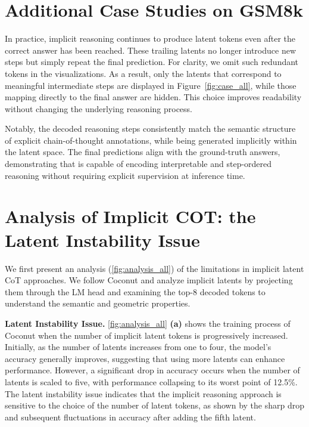 \section{Additional Case Studies on GSM8k}
In practice, implicit reasoning continues to produce latent tokens even after the correct answer has been reached. These trailing latents no longer introduce new steps but simply repeat the final prediction. For clarity, we omit such redundant tokens in the visualizations. As a result, only the latents that correspond to meaningful intermediate steps are displayed in Figure~\ref{fig:case_all}, while those mapping directly to the final answer are hidden. This choice improves readability without changing the underlying reasoning process.

Notably, the decoded reasoning steps consistently match the semantic structure of explicit chain-of-thought annotations, while being generated implicitly within the latent space. The final predictions align with the ground-truth answers, demonstrating that \methodname is capable of encoding interpretable and step-ordered reasoning without requiring explicit supervision at inference time.  




\section{Analysis of Implicit COT: the Latent Instability Issue}
We first present an analysis (\cref{fig:analysis_all}) of the limitations in implicit latent CoT approaches.
We follow Coconut \citep{hao2024coconut} and analyze implicit latents by projecting them through the LM head and examining the top-8 decoded tokens to understand the semantic and geometric properties.

\noindent \textbf{Latent Instability Issue.}
\cref{fig:analysis_all} \textbf{(a)} shows the training process of Coconut when the number of implicit latent tokens is progressively increased. 
Initially, as the number of latents increases from one to four, the model's accuracy generally improves, suggesting that using more latents can enhance performance.
However, a significant drop in accuracy occurs when the number of latents is scaled to five, with performance collapsing to its worst point of 12.5\%. 
The latent instability issue indicates that the implicit reasoning approach is sensitive to the choice of the number of latent tokens, as shown by the sharp drop and subsequent fluctuations in accuracy after adding the fifth latent.

